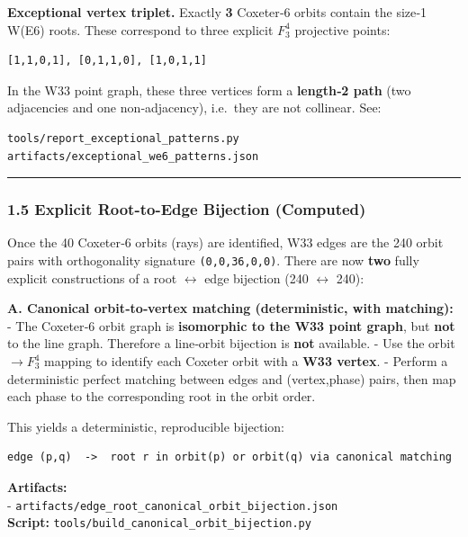 \documentclass[11pt]{article}
\begin{document}
\textbf{Exceptional vertex triplet.} Exactly \textbf{3} Coxeter‑6 orbits
contain the size‑1 W(E6) roots. These correspond to three explicit
\(F_{3}^{4}\) projective points:

\begin{verbatim}
[1,1,0,1], [0,1,1,0], [1,0,1,1]
\end{verbatim}

In the W33 point graph, these three vertices form a \textbf{length‑2
path} (two adjacencies and one non‑adjacency), i.e.~they are not
collinear. See:

\begin{verbatim}
tools/report_exceptional_patterns.py
artifacts/exceptional_we6_patterns.json
\end{verbatim}

\begin{center}\rule{0.5\linewidth}{0.5pt}\end{center}

\subsubsection{1.5 Explicit Root-to-Edge Bijection
(Computed)}\label{explicit-root-to-edge-bijection-computed}

Once the 40 Coxeter‑6 orbits (rays) are identified, W33 edges are the
240 orbit pairs with orthogonality signature \texttt{(0,0,36,0,0)}.
There are now \textbf{two} fully explicit constructions of a root
\ensuremath{\leftrightarrow} edge bijection (240
\ensuremath{\leftrightarrow} 240):

\textbf{A. Canonical orbit‑to‑vertex matching (deterministic, with
matching):} - The Coxeter‑6 orbit graph is \textbf{isomorphic to the W33
point graph}, but \textbf{not} to the line graph. Therefore a line‑orbit
bijection is \textbf{not} available. - Use the
orbit\ensuremath{\rightarrow}\(F_{3}^{4}\) mapping to identify each
Coxeter orbit with a \textbf{W33 vertex}. - Perform a deterministic
perfect matching between edges and (vertex,phase) pairs, then map each
phase to the corresponding root in the orbit order.

This yields a deterministic, reproducible bijection:

\begin{verbatim}
edge (p,q)  ->  root r in orbit(p) or orbit(q) via canonical matching
\end{verbatim}

\textbf{Artifacts:}\\
- \texttt{artifacts/edge\_root\_canonical\_orbit\_bijection.json}\\
\textbf{Script:} \texttt{tools/build\_canonical\_orbit\_bijection.py}
\end{document}
